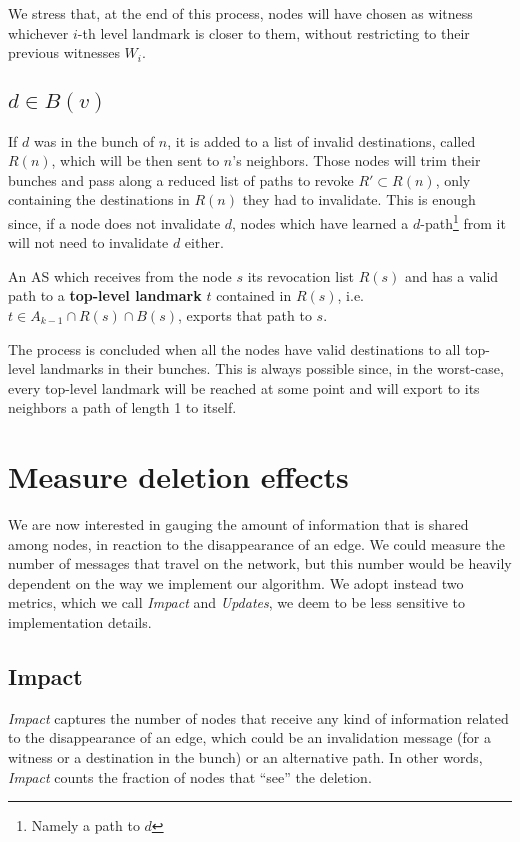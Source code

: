 \documentclass[a4paper,11pt,oneside]{report}
\begin{document}
We stress that, at the end of this process, nodes will have chosen as witness whichever $i$-th level landmark is closer to them, without restricting to their previous witnesses $W_i$.

\subsection{$d \in B(v)$}
If $d$ was in the bunch of $n$, it is added to a list of invalid destinations, called $R(n)$, which will be then sent to $n$'s neighbors. Those nodes will trim their bunches and pass along a reduced list of paths to revoke $R' \subset R(n)$, only containing the destinations in $R(n)$ they had to invalidate. This is enough since, if a node does not invalidate $d$, nodes which have learned a $d$-path\footnote{Namely a path to $d$} from it will not need to invalidate $d$ either.

An AS which receives from the node $s$ its revocation list $R(s)$ and has a valid path to a \textbf{top-level landmark} $t$ contained in $R(s)$, i.e. $t \in A_{k-1} \cap R(s) \cap B(s)$, exports that path to $s$.

The process is concluded when all the nodes have valid destinations to all top-level landmarks in their bunches. This is always possible since, in the worst-case, every top-level landmark will be reached at some point and will export to its neighbors a path of length 1 to itself.

\section{Measure deletion effects}
We are now interested in gauging the amount of information that is shared among nodes, in reaction to the disappearance of an edge. We could measure the number of messages that travel on the network, but this number would be heavily dependent on the way we implement our algorithm. We adopt instead two metrics, which we call \emph{Impact} and \emph{Updates}, we deem to be less sensitive to implementation details.

\subsection{Impact}
\textit{Impact} captures the number of nodes that receive any kind of information related to the disappearance of an edge, which could be an invalidation message (for a witness or a destination in the bunch) or an alternative path.
In other words, \textit{Impact} counts the fraction of nodes that ``see'' the deletion.
\end{document}

